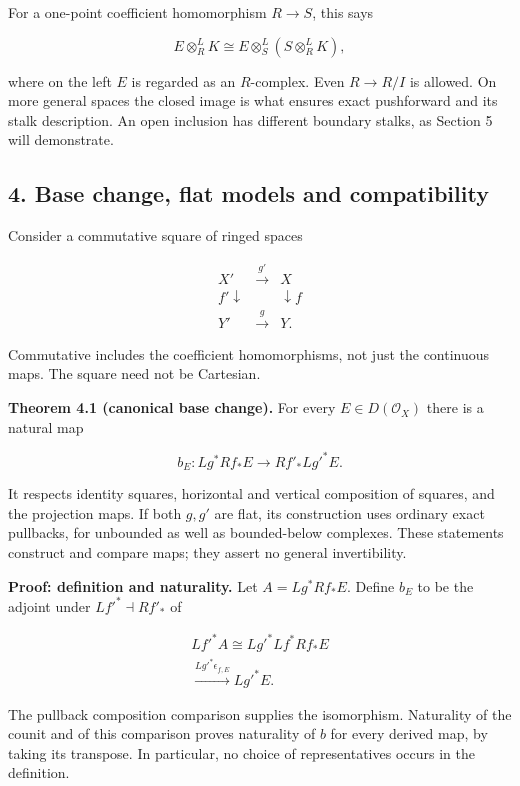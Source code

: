 \documentclass[
  english,
  11pt,
  a4paper,
]{article}
\begin{document}
For a one-point coefficient homomorphism \(R\to S\), this says

\[E\otimes_R^L K\cong E\otimes_S^L(S\otimes_R^L K),
\tag{3.3}\]

where on the left \(E\) is regarded as an \(R\)-complex. Even
\(R\to R/I\) is allowed. On more general spaces the closed image is what
ensures exact pushforward and its stalk description. An open inclusion
has different boundary stalks, as Section 5 will demonstrate.

\subsection{4. Base change, flat models and
compatibility}\label{projection-formula-and-base-change--4-base-change-flat-models-and-compatibility}

Consider a commutative square of ringed spaces

\[\begin{array}{ccc}
X'&\xrightarrow{g'}&X\\
{\scriptstyle f'}\downarrow&&\downarrow{\scriptstyle f}\\
Y'&\xrightarrow{g}&Y.
\end{array}
\tag{4.1}\]

Commutative includes the coefficient homomorphisms, not just the
continuous maps. The square need not be Cartesian.

\textbf{Theorem 4.1 (canonical base change).} For every
\(E\in D(\mathcal O_X)\) there is a natural map

\[b_E:Lg^*Rf_*E\longrightarrow Rf'_*Lg'^*E.
\tag{4.2}\]

It respects identity squares, horizontal and vertical composition of
squares, and the projection maps. If both \(g,g'\) are flat, its
construction uses ordinary exact pullbacks, for unbounded as well as
bounded-below complexes. These statements construct and compare maps;
they assert no general invertibility.

\textbf{Proof: definition and naturality.} Let \(A=Lg^*Rf_*E\). Define
\(b_E\) to be the adjoint under \(Lf'^*\dashv Rf'_*\) of

\[\begin{gathered}
Lf'^*A\cong Lg'^*Lf^*Rf_*E\\
\xrightarrow{Lg'^*\epsilon_{f,E}}Lg'^*E.
\end{gathered}
\tag{4.3}\]

The pullback composition comparison supplies the isomorphism. Naturality
of the counit and of this comparison proves naturality of \(b\) for
every derived map, by taking its transpose. In particular, no choice of
representatives occurs in the definition.
\end{document}
